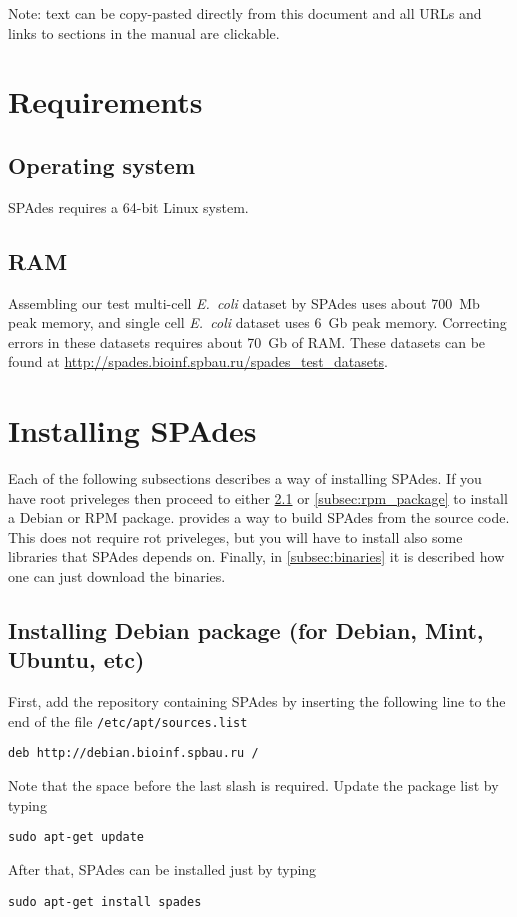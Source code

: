 \documentclass{article}
\def\spades{SPAdes}
\def\ecoli{\it E.~coli}
\begin{document}
Note: text can be copy-pasted directly from this document
and all URLs and links to sections in the manual are clickable.


\section{Requirements}
\subsection{Operating system}
{\spades} requires a 64-bit Linux system.

\subsection{RAM}
Assembling our test multi-cell {\ecoli} dataset 
by {\spades} uses about 700~Mb peak memory, and single cell
{\ecoli} dataset uses 6~Gb peak memory. 
Correcting errors in these datasets requires about 70~Gb of RAM.
These datasets can be found at \url{http://spades.bioinf.spbau.ru/spades_test_datasets}.

\section{Installing {\spades}}
Each of the following subsections describes a way of installing {\spades}.
If you have root priveleges then proceed to either \cref{subsec:deb_package}
or \cref{subsec:rpm_package} to install a Debian or RPM package.
 provides a way to build {\spades}
from the source code. This does not require rot priveleges, but 
you will have to install also some libraries that {\spades} depends on.
Finally, in \cref{subsec:binaries} it is described how one can just 
download the binaries.


\subsection{Installing Debian package (for Debian, Mint, Ubuntu, etc)}\label{subsec:deb_package}
First, add the repository containing {\spades} by inserting the following line
to the end of the file {\tt /etc/apt/sources.list}
\begin{lstlisting}
deb http://debian.bioinf.spbau.ru /
\end{lstlisting}
Note that the space before the last slash is required. 
Update the package list by typing
\begin{lstlisting}
sudo apt-get update
\end{lstlisting}
After that, {\spades} can be installed just by typing
\begin{lstlisting}
sudo apt-get install spades
\end{lstlisting}
\end{document}
